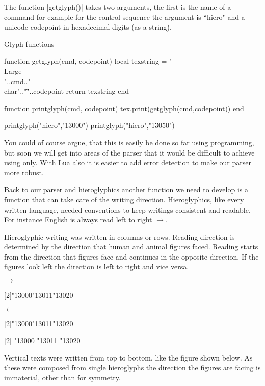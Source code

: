 The function |getglyph()| takes two arguments, the first is the
name of a command for example for the control sequence \cmd{\hiero} the argument is  ``hiero" and a unicode codepoint in hexadecimal digits (as a string).

\begin{texexample}{Glyph functions}{}
\begin{luacode*}
function getglyph(cmd, codepoint)
  local texstring = "\\Large\\"..cmd.." \\char".."\""..codepoint
  return texstring
end

function printglyph(cmd, codepoint)
  tex.print(getglyph(cmd,codepoint))
end

printglyph("hiero","13000")
printglyph("hiero","13050")
\end{luacode*}
\end{texexample}

You could of course argue, that this is easily be done so far using \tex programming, but soon we will get into areas of the parser that it would be difficult to achieve using \tex only. With Lua also it is easier to add error detection to make our parser more robust.

Back to our parser and hieroglyphics another function we need to develop is a function that can take care of the writing direction. Hieroglyphics, like every written language,  needed conventions to keep writings consistent and readable. For instance English is always read left to right $\rightarrow$. 

Hieroglyphic writing was written in columns or rows. Reading direction is determined by the direction that human and animal figures faced. Reading starts from the direction that figures face and continues in the opposite direction. If the figures look left the direction is left to right and vice versa.

\begin{center}
\bgroup
$\rightarrow$

\scalebox{2}[2]{\hiero\char"13000\char"13011\char"13020}

$\leftarrow$

\scalebox{-2}[2]{\hiero\char"13000\char"13011\char"13020}

\scalebox{2}[2]{\hiero
\char"13000
\char"13011
\char"13020}
\egroup
\end{center}

Vertical texts were written from top to bottom, like the figure shown below. As these were composed from single hieroglyphs the direction the figures are facing is immaterial, other than for symmetry.

